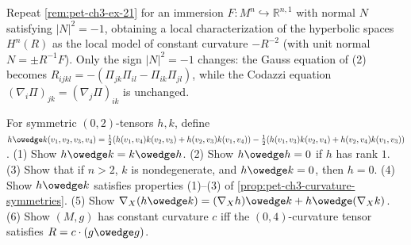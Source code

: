 \begin{remark}[Exercise 3.4.22]
  \label{rem:pet-ch3-ex-22}
  \leanok
  Repeat \cref{rem:pet-ch3-ex-21} for an immersion $F:M^n\hookrightarrow\mathbb
  R^{n,1}$ with normal $N$ satisfying $|N|^2=-1$, obtaining a local
  characterization of the hyperbolic spaces $H^n(R)$ as the local model of
  constant curvature $-R^{-2}$ (with unit normal $N=\pm R^{-1}F$). Only the sign
  $|N|^2=-1$ changes: the Gauss equation of (2) becomes
  $R_{ijkl}=-(\Pi_{jk}\Pi_{il}-\Pi_{ik}\Pi_{jl})$, while the Codazzi equation
  $(\nabla_i\Pi)_{jk}=(\nabla_j\Pi)_{ik}$ is unchanged.
\end{remark}

\begin{remark}
  \label{rem:pet-ch3-ex-23}
  \leanok
  For symmetric $(0,2)$-tensors $h,k$, define
  $h\owedge k(v_1,v_2,v_3,v_4)=\tfrac12(h(v_1,v_4)k(v_2,v_3)+h(v_2,v_3)k(v_1,v_4))
  -\tfrac12(h(v_1,v_3)k(v_2,v_4)+h(v_2,v_4)k(v_1,v_3))$. (1) Show $h\owedge
  k=k\owedge h$. (2) Show $h\owedge h=0$ if $h$ has rank $1$. (3) Show that if
  $n>2$, $k$ is nondegenerate, and $h\owedge k=0$, then $h=0$. (4) Show $h\owedge
  k$ satisfies properties (1)--(3) of \cref{prop:pet-ch3-curvature-symmetries}.
  (5) Show $\nabla_X(h\owedge k)=(\nabla_Xh)\owedge k+h\owedge(\nabla_Xk)$. (6)
  Show $(M,g)$ has constant curvature $c$ iff the $(0,4)$-curvature tensor
  satisfies $R=c\cdot(g\owedge g)$.
\end{remark}

